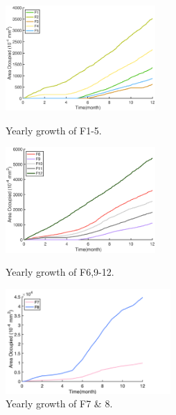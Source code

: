 \documentclass[a4paper,12pt]{article}
\begin{document}
\begin{figure}[H]
	\begin{minipage}{30ex}
	\includegraphics[height=4cm]{./formal/tropical/1-5.eps}
	\caption{Yearly growth of F1-5.}
	\label{F1-5}
\end{minipage}   
\begin{minipage}{30.5ex}
\centering
	\includegraphics[height=4cm]{./formal/tropical/6&9-12.eps}
	\caption{Yearly growth of F6,9-12.}
	\label{F6}
\end{minipage}
\begin{minipage}{29ex}
\centering
	\includegraphics[height=4cm]{./formal/tropical/78.png}
	\caption{Yearly growth of F7 \& 8.}
	\label{F78}
\end{minipage} 
\end{figure}
\end{document}

